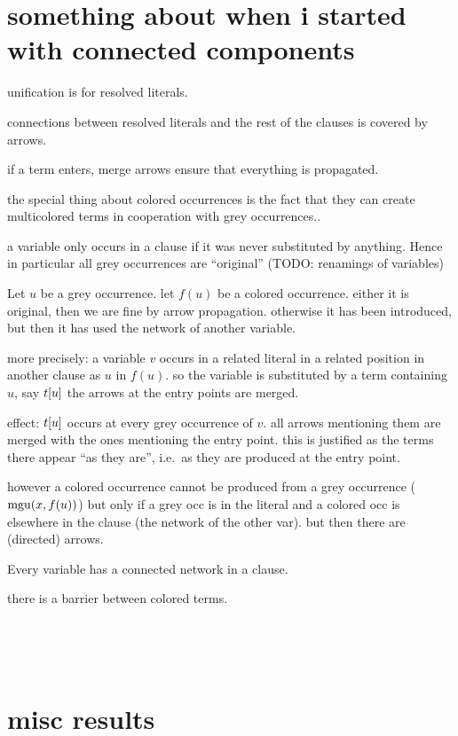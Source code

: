 \documentclass[,%
	paper=a4,%
	DIV10, %
	twoside=false,%
	liststotoc,
	bibtotoc,
	draft=false,%
	numbers=noendperiod
]{scrartcl}
\begin{document}
\section*{something about when i started with connected components}

unification is for resolved literals.

connections between resolved literals and the rest of the clauses is covered by arrows.

if a term enters, merge arrows ensure that everything is propagated.

the special thing about colored occurrences is the fact that they can create multicolored terms in cooperation with grey occurrences..

a variable only occurs in a clause if it was never substituted by anything. Hence in particular all grey occurrences are ``original'' (TODO: renamings of variables)

Let $u$ be a grey occurrence.
let $f(u)$ be a colored occurrence.
either it is original, then we are fine by arrow propagation.
otherwise it has been introduced, but then it has used the network of another variable.

more precisely: %
a variable $v$ occurs in a related literal in a related position in another clause as $u$ in $f(u)$.
so the variable is substituted by a term containing $u$, say $t[u]$
the arrows at the entry points are merged.

effect: 
$t[u]$ occurs at every grey occurrence of $v$. all arrows mentioning them are merged with the ones mentioning the entry point.
this is justified as the terms there appear ``as they are'', i.e.\ as they are produced at the entry point.

however a colored occurrence cannot be produced from a grey occurrence ($\operatorname{mgu}(x, f(u))$) but only if a grey occ is in the literal and a colored occ is elsewhere in the clause (the network of the other var). but then there are (directed) arrows.


Every variable has a connected network in a clause. 

there is a barrier between colored terms.

~

~

\section{misc results}
\end{document}
